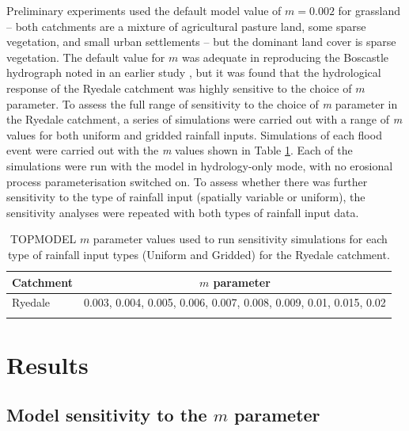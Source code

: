 Preliminary experiments used the default model value of \(m = 0.002\) for grassland -- both catchments are a mixture of agricultural pasture land, some sparse vegetation, and small urban settlements -- but the dominant land cover is sparse vegetation. The default value for \(m\) was adequate in reproducing the Boscastle hydrograph noted in an earlier study \citep{wallingford2005flooding}, but it was found that the hydrological response of the Ryedale catchment was highly sensitive to the choice of \(m\) parameter. To assess the full range of sensitivity to the choice of \textit{m} parameter in the Ryedale catchment, a series of simulations were carried out with a range of \textit{m} values for both uniform and gridded rainfall inputs. Simulations of each flood event were carried out with the \textit{m} values shown in Table \ref{table-m-sens}. Each of the simulations were run with the model in hydrology-only mode, with no erosional process parameterisation switched on. To assess whether there was further sensitivity to the type of rainfall input (spatially variable or uniform), the sensitivity analyses were repeated with both types of rainfall input data.

\begin{table}
\begin{tabular}{lc}
\textbf{Catchment} & \textbf{\(m\) parameter} \\
\hline
Ryedale     & 0.003, 0.004, 0.005, 0.006, 0.007, 0.008, 0.009, 0.01, 0.015, 0.02  \\
\hline
\\ 
\end{tabular}
\caption{TOPMODEL \(m\) parameter values used to run sensitivity simulations for each type of rainfall input types (Uniform and Gridded) for the Ryedale catchment. }
\label{table-m-sens}
\end{table}

\section{Results}

\subsection{Model sensitivity to the \(m\) parameter}

